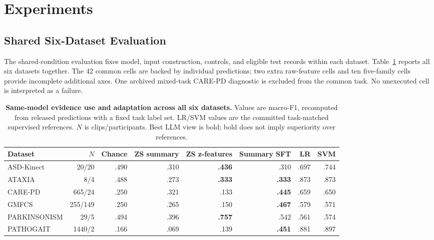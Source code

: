 \section{Experiments}
\label{sec:experiments}
\subsection{Shared Six-Dataset Evaluation}
The shared-condition evaluation fixes model, input construction, controls, and eligible test records within each dataset. Table~\ref{tab:shared_results} reports all six datasets together. The 42 common cells are backed by individual predictions; two extra raw-feature cells and ten five-family cells provide incomplete additional axes. One archived mixed-task CARE-PD diagnostic is excluded from the common task. No unexecuted cell is interpreted as a failure.




\begin{table}[t]
\centering\small
\caption{\textbf{Same-model evidence use and adaptation across all six datasets.} Values are macro-F1, recomputed from released predictions with a fixed task label set. LR/SVM values are the committed task-matched supervised references. $N$ is clips/participants. Best LLM view is bold; bold does not imply superiority over references.}
\label{tab:shared_results}
\begin{tabular*}{\textwidth}{@{\extracolsep{\fill}}lrrrrrrr@{}}\toprule
Dataset & $N$ & Chance & ZS summary & ZS z-features & Summary SFT & LR & SVM\\\midrule
ASD-Kinect & 20/20 & .490 & .310 & \textbf{.436} & .310 & .697 & .744\\
ATAXIA & 8/4 & .488 & .273 & \textbf{.333} & \textbf{.333} & .873 & .873\\
CARE-PD & 665/24 & .250 & .321 & .133 & \textbf{.445} & .659 & .650\\
GMFCS & 255/149 & .250 & .265 & .150 & \textbf{.467} & .579 & .571\\
PARKINSONISM & 29/5 & .494 & .396 & \textbf{.757} & .542 & .561 & .574\\
PATHOGAIT & 1440/2 & .166 & .069 & .139 & \textbf{.451} & .881 & .897\\\bottomrule
\end{tabular*}
\end{table}

